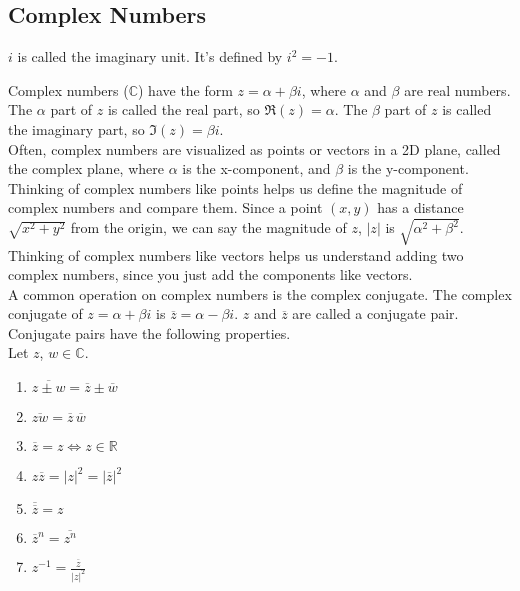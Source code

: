 \subsection{Complex Numbers}
\begin{definition}
	$i$ is called the imaginary unit. It's defined by $i^2 = -1$.
\end{definition}


\noindent
Complex numbers ($\mathbb{C}$) have the form $z = \alpha + \beta i$, where $\alpha$ and $\beta$ are real numbers. The $\alpha$ part of $z$ is called the real part, so $\Re(z) = \alpha$. The $\beta$ part of $z$ is called the imaginary part, so $\Im(z) = \beta i$.\\

\noindent
Often, complex numbers are visualized as points or vectors in a 2D plane, called the complex plane, where $\alpha$ is the x-component, and $\beta$ is the y-component. Thinking of complex numbers like points helps us define the magnitude of complex numbers and compare them. Since a point $(x,y)$ has a distance $\sqrt{x^2+y^2}$ from the origin, we can say the magnitude of $z$, $\lvert z \rvert$ is $\sqrt{\alpha^2 + \beta^2}$. Thinking of complex numbers like vectors helps us understand adding two complex numbers, since you just add the components like vectors.\\

\noindent
A common operation on complex numbers is the complex conjugate. The complex conjugate of $z = \alpha + \beta i$ is $\overline{z} = \alpha - \beta i$. $z$ and $\overline{z}$ are called a conjugate pair.\\

\noindent
Conjugate pairs have the following properties.
\\Let $z$, $w \in \mathbb{C}$.
\begin{enumerate}[label=]
	\item $\overline{z \pm w} = \overline{z} \pm \overline{w}$
	\item $\overline{zw}=\overline{z}\hspace{2pt}\overline{w}$
	\item $\overline{z}=z \Leftrightarrow z \in \mathbb{R}$
	\item $z\overline{z} = \lvert z \rvert^2 = \lvert \overline{z} \rvert^2$
	\item $\overline{\overline{z}} = z$
	\item $\overline{z}^n = \overline{z^n}$
	\item $z^{-1} = \frac{\overline{z}}{\lvert z \rvert^2}$
\end{enumerate}